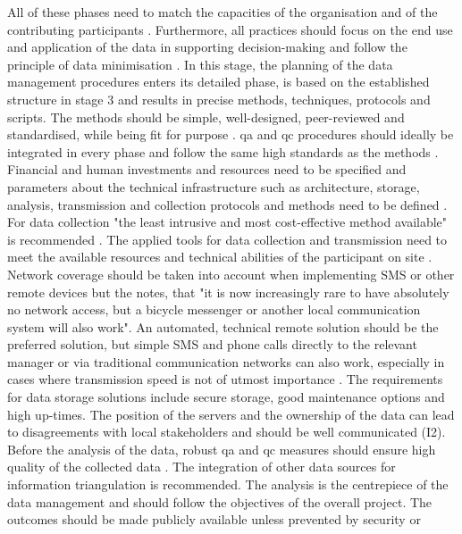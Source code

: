 All of these phases need to match the capacities of the organisation and of the contributing participants \autocite{ifrcCommunityBasedSurveillanceGuiding2017,minkmanCitizenScienceWater2015}. Furthermore, all practices should focus on the end use and application of the data in supporting decision-making and follow the principle of data minimisation \autocite{edpsGlossaryEuropeanData2023,ifrcCommunityBasedSurveillanceGuiding2017,minkmanCitizenScienceWater2015}. In this stage, the planning of the data management procedures enters its detailed phase, is based on the established structure in stage 3 and results in precise methods, techniques, protocols and scripts. The methods should be simple, well-designed, peer-reviewed and standardised, while being fit for purpose \autocite{fraislCitizenScienceEnvironmental2022,ifrcCommunityBasedSurveillanceGuiding2017,silvertownNewDawnCitizen2009,whitelawEstablishingCanadianCommunity2003}. \acrshort{qa} and \acrshort{qc} procedures should ideally be integrated in every phase and follow the same high standards as the methods \autocite{fraislCitizenScienceEnvironmental2022,mackechnieRoleBigSociety2011,sharpeCommunityBasedEcological2006,silvertownNewDawnCitizen2009}. Financial and human investments and resources need to be specified and parameters about the technical infrastructure such as architecture, storage, analysis, transmission and collection protocols and methods need to be defined \autocite{fraislCitizenScienceEnvironmental2022,sharpeCommunityBasedEcological2006}. For data collection "the least intrusive and most cost-effective method available" is recommended \autocite[27]{ifrcCommunityBasedSurveillanceGuiding2017}. The applied tools for data collection and transmission need to meet the available resources and technical abilities of the participant on site \autocite{ifrcCommunityBasedSurveillanceGuiding2017,minkmanCitizenScienceWater2015}. Network coverage should be taken into account when implementing SMS or other remote devices but the \autocite[26]{ifrcCommunityBasedSurveillanceGuiding2017} notes, that "it is now increasingly rare to have absolutely no network access, but a bicycle messenger or another local communication system will also work". An automated, technical remote solution should be the preferred solution, but simple SMS and phone calls directly to the relevant manager or via traditional communication networks can also work, especially in cases where transmission speed is not of utmost importance \autocite{gualazziniEWEAEarlyWarning2021,ifrcCommunityBasedSurveillanceGuiding2017}. The requirements for data storage solutions include secure storage, good maintenance options and high up-times. The position of the servers and the ownership of the data can lead to disagreements with local stakeholders and should be well communicated (I2). Before the analysis of the data, robust \acrshort{qa} and \acrshort{qc} measures should ensure high quality of the collected data \autocite{fraislCitizenScienceEnvironmental2022,sharpeCommunityBasedEcological2006}. The integration of other data sources for information triangulation is recommended. The analysis is the centrepiece of the data management and should follow the objectives of the overall project. The outcomes should be made publicly available unless prevented by security or 